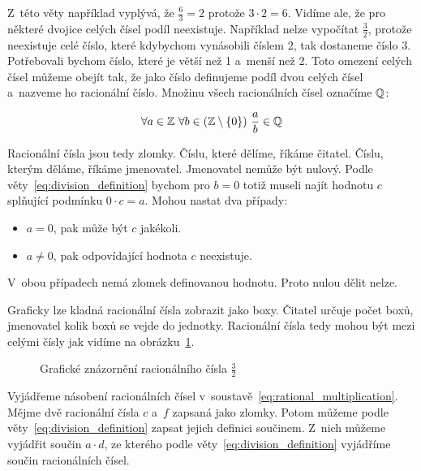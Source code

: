 Z~této věty například vyplývá, že \(\frac{6}{3} = 2\) protože \(3 \cdot 2 = 6\). Vidíme ale, že pro některé dvojice celých čísel podíl neexistuje. Například nelze vypočítat \(\frac{3}{2}\), protože neexistuje celé číslo, které kdybychom vynásobili číslem 2, tak dostaneme číslo 3. Potřebovali bychom číslo, které je větší než 1 a~menší než 2. Toto omezení celých čísel můžeme obejít tak, že jako číslo definujeme podíl dvou celých čísel a~nazveme ho racionální číslo. Množinu všech racionálních čísel označíme \(\mathbb{Q}\):

\begin{equation}
\forall a \in \mathbb{Z} \ \forall b \in (\mathbb{Z} \setminus \{0\}) \ \frac{a}{b} \in \mathbb{Q}
\end{equation}

Racionální čísla jsou tedy zlomky. Číslu, které dělíme, říkáme čitatel. Číslu, kterým děláme, říkáme jmenovatel. Jmenovatel nemůže být nulový. Podle věty~\eqref{eq:division_definition} bychom pro \(b = 0\) totiž museli najít hodnotu \(c\) splňující podmínku \(0 \cdot c = a\). Mohou nastat dva případy:

\begin{itemize}
	\item \(a = 0\), pak může být \(c\) jakékoli.
	\item \(a \neq 0\), pak odpovídající hodnota \(c\) neexistuje. 
\end{itemize}

V~obou případech nemá zlomek definovanou hodnotu. Proto nulou dělit nelze.

Graficky lze kladná racionální čísla zobrazit jako boxy. Čitatel určuje počet boxů, jmenovatel kolik boxů se vejde do jednotky. Racionální čísla tedy mohou být mezi celými čísly jak vidíme na obrázku~\ref{img:rational_definition}.

\begin{figure}[!h]
\centering
{}
\caption{Grafické znázornění racionálního čísla \(\frac{3}{2}\)}
\label{img:rational_definition}
\end{figure}

Vyjádřeme násobení racionálních čísel v~soustavě~\eqref{eq:rational_multiplication}. Mějme dvě racionální čísla \(c\) a~\(f\) zapsaná jako zlomky. Potom můžeme podle věty~\eqref{eq:division_definition} zapsat jejich definici součinem. Z~nich můžeme vyjádřit součin \(a \cdot d\), ze kterého podle věty~\eqref{eq:division_definition} vyjádříme součin racionálních čísel.

